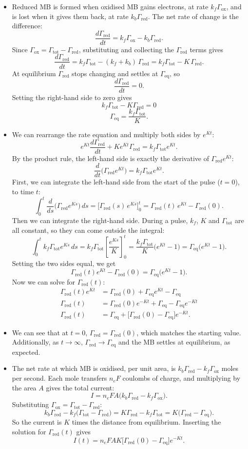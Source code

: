 \documentclass[10pt,a4paper]{article}
\numberwithin{equation}{section}
\newcommand{\Gtot}{\Gamma_{\mathrm{tot}}}
\newcommand{\Gred}{\Gamma_{\mathrm{red}}}
\newcommand{\Gox}{\Gamma_{\mathrm{ox}}}
\newcommand{\Geq}{\Gamma_{\mathrm{eq}}}
\newcommand{\dropdown}{\par\medskip}
\begin{document}
\dropdown
\begin{itemize}
  \item Reduced MB is formed when oxidised MB gains electrons, at rate $k_f\Gox$, and is lost when it gives them back, at rate $k_b\Gred$. The net rate of change is the difference:
  \[ \frac{d\Gred}{dt} = k_f\Gox - k_b\Gred. \]
  Since $\Gox = \Gtot - \Gred$, substituting and collecting the $\Gred$ terms gives
  \[ \frac{d\Gred}{dt} = k_f\Gtot - (k_f + k_b)\,\Gred = k_f\Gtot - K\,\Gred. \]
  At equilibrium $\Gred$ stops changing and settles at $\Geq$, so
  \[ \frac{d\Gred}{dt} = 0. \]
  Setting the right-hand side to zero gives
  \[ k_f\Gtot - K\Gred = 0 \]
  \[ \Geq = \frac{k_f\Gtot}{K}. \]
  \item We can rearrange the rate equation and multiply both sides by $e^{Kt}$:
  \[ e^{Kt}\frac{d\Gred}{dt} + Ke^{Kt}\Gred = k_f\Gtot e^{Kt}. \]
  By the product rule, the left-hand side is exactly the derivative of $\Gred e^{Kt}$:
  \[ \frac{d}{dt}\big(\Gred e^{Kt}\big) = k_f\Gtot e^{Kt}. \]
  First, we can integrate the left-hand side from the start of the pulse ($t = 0$), to time $t$:
  \[ \int_0^t\frac{d}{ds}\big(\Gred e^{Ks}\big)\,ds = \Big[\Gred(s)\,e^{Ks}\Big]_0^t = \Gred(t)\,e^{Kt} - \Gred(0). \]
  Then we can integrate the right-hand side. During a pulse, $k_f$, $K$ and $\Gtot$ are all constant, so they can come outside the integral:
  \[ \int_0^t k_f\Gtot e^{Ks}\,ds = k_f\Gtot\left[\frac{e^{Ks}}{K}\right]_0^t = \frac{k_f\Gtot}{K}\big(e^{Kt} - 1\big) = \Geq\big(e^{Kt} - 1\big). \]
  Setting the two sides equal, we get
  \[ \Gred(t)e^{Kt} - \Gred(0) = \Geq\big(e^{Kt} - 1\big). \]
  Now we can solve for $\Gred(t)$:
  \begin{align*}
  \Gred(t)e^{Kt} &= \Gred(0) + \Geq e^{Kt} - \Geq\\
  \Gred(t) &= \Gred(0)e^{-Kt} + \Geq - \Geq e^{-Kt}\\
  \Gred(t) &= \Geq + \big[\Gred(0) - \Geq\big]e^{-Kt}.
  \end{align*}
  \item We can see that at $t = 0$, $\Gred = \Gred(0)$, which matches the starting value. Additionally, as $t\to\infty$, $\Gred\to\Geq$ and the MB settles at equilibrium, as expected.
  \item The net rate at which MB is oxidised, per unit area, is $k_b\Gred - k_f\Gox$ moles per second. Each mole transfers $n_eF$ coulombs of charge, and multiplying by the area $A$ gives the total current:
  \[ I = n_eFA\big(k_b\Gred - k_f\Gox\big). \]
  Substituting $\Gox = \Gtot - \Gred$:
  \[ k_b\Gred - k_f\big(\Gtot - \Gred\big) = K\Gred - k_f\Gtot = K\big(\Gred - \Geq\big). \]
  So the current is $K$ times the distance from equilibrium. Inserting the solution for $\Gred(t)$ gives
  \[ I(t) = n_eFAK\big[\Gred(0) - \Geq\big]e^{-Kt}. \]
\end{itemize}
\end{document}
